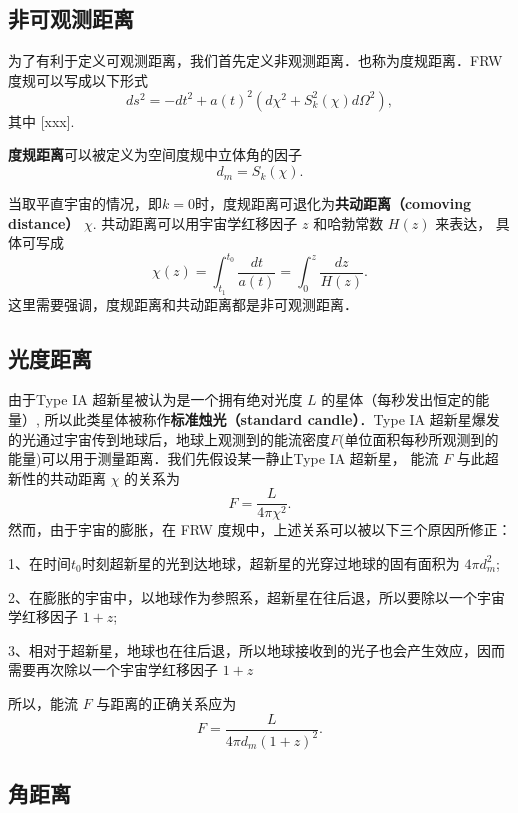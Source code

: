 

\subsection{非可观测距离}
为了有利于定义可观测距离，我们首先定义非观测距离．也称为度规距离．FRW 度规可以写成以下形式
\begin{equation}
ds^2=-dt^2+a(t)^2(d\chi^2+S^2_k (\chi) d\Omega^2),
\end{equation}
其中
[xxx]. %

\textbf{度规距离}可以被定义为空间度规中立体角的因子
\begin{equation}
d_m=S_k(\chi).
\end{equation}

当取平直宇宙的情况，即$k=0$时，度规距离可退化为\textbf{共动距离（comoving distance）} $\chi$. 共动距离可以用宇宙学红移因子 $z$ 和哈勃常数 $H(z)$ 来表达， 具体可写成
\begin{equation}
\chi(z)=\int^{t_0}_{t_1} \frac{dt}{a(t)}=\int^z_0 \frac{dz}{H(z)}.
\end{equation}
这里需要强调，度规距离和共动距离都是非可观测距离．

\subsection{光度距离}
由于Type IA 超新星被认为是一个拥有绝对光度 $L$ 的星体（每秒发出恒定的能量）, 所以此类星体被称作\textbf{标准烛光（standard candle）}．Type IA 超新星爆发的光通过宇宙传到地球后，地球上观测到的能流密度$F$(单位面积每秒所观测到的能量)可以用于测量距离．我们先假设某一静止Type IA 超新星， 能流 $F$ 与此超新性的共动距离 $\chi$ 的关系为
\begin{equation}
F=\frac{L}{4\pi \chi^2}.
\end{equation}
然而，由于宇宙的膨胀，在 FRW 度规中，上述关系可以被以下三个原因所修正：

1、在时间$t_0$时刻超新星的光到达地球，超新星的光穿过地球的固有面积为 $4\pi d_m^2$;

2、在膨胀的宇宙中，以地球作为参照系，超新星在往后退，所以要除以一个宇宙学红移因子 $1+z$;

3、相对于超新星，地球也在往后退，所以地球接收到的光子也会产生效应，因而需要再次除以一个宇宙学红移因子 $1+z$

所以，能流 $F$ 与距离的正确关系应为
\begin{equation}
F=\frac{L}{4\pi d_m (1+z)^2}.
\end{equation}

\subsection{角距离}